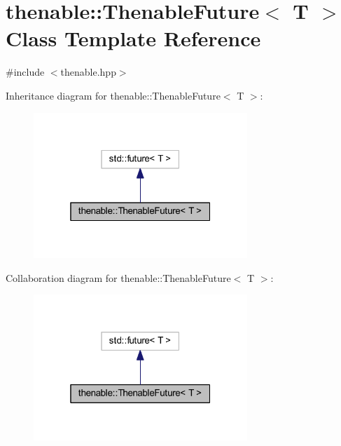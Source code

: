 \hypertarget{classthenable_1_1_thenable_future}{}\section{thenable\+:\+:Thenable\+Future$<$ T $>$ Class Template Reference}
\label{classthenable_1_1_thenable_future}


{\ttfamily \#include $<$thenable.\+hpp$>$}



Inheritance diagram for thenable\+:\+:Thenable\+Future$<$ T $>$\+:\nopagebreak
\begin{figure}[H]
\begin{center}
\leavevmode
\includegraphics[width=229pt]{classthenable_1_1_thenable_future__inherit__graph}
\end{center}
\end{figure}


Collaboration diagram for thenable\+:\+:Thenable\+Future$<$ T $>$\+:\nopagebreak
\begin{figure}[H]
\begin{center}
\leavevmode
\includegraphics[width=229pt]{classthenable_1_1_thenable_future__coll__graph}
\end{center}
\end{figure}

